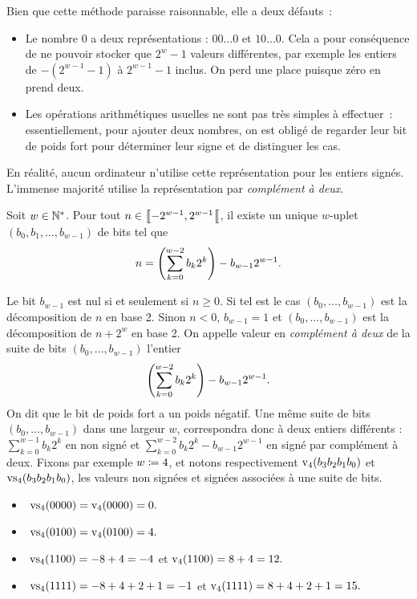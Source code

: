 \documentclass{magnoliaold}
\begin{document}
Bien que cette méthode paraisse raisonnable, elle a deux défauts~:
\begin{itemize}
  \item Le nombre 0 a deux représentations : $00\dots0$ et $10\dots0$. Cela a pour
  conséquence de ne pouvoir stocker que $2^w - 1$ valeurs différentes, par exemple les entiers
  de $-(2^{w-1} - 1)$ à $2^{w- 1} - 1$ inclus. On perd une place puisque zéro en prend deux.
  \item Les opérations arithmétiques usuelles ne sont pas très simples à effectuer~: essentiellement,
  pour ajouter deux nombres, on est obligé de regarder leur bit de poids fort pour déterminer
  leur signe et de distinguer les cas.
\end{itemize}

En réalité, aucun ordinateur n'utilise cette représentation pour les entiers signés.
L'immense majorité utilise la représentation par \emph{complément à deux}.

\begin{proposition}
Soit $w\in{\mathbb{N}^*}$. Pour tout $n\in\left\llbracket -2^{w-1},2^{w-1}\right\llbracket$, il existe un unique $w$-uplet
$(b_0,b_1,\ldots,b_{w-1})$ de bits tel que
\[n=\left(\sum_{k=0}^{w-2} b_k 2^k\right) - b_{w-1}2^{w-1}.\]
\end{proposition}

\begin{remarques}
\remarque Le bit $b_{w-1}$ est nul si et seulement si $n\geq 0$. Si tel est le cas
  $(b_0,\ldots,b_{w-1})$ est la décomposition de $n$ en base 2.
  Sinon $n<0$, $b_{w-1}=1$ et $(b_0,\ldots,b_{w-1})$ est la décomposition de
  $n + 2^w$ en base 2.
\remarque On appelle valeur en \emph{complément à deux} de la suite
de bits $(b_0, \ldots, b_{w-1})$ l'entier
\[\left(\sum_{k=0}^{w-2} b_k 2^k\right) - b_{w-1}2^{w-1}.\]
  On dit que le bit de poids fort a un poids négatif.
\remarque Une même suite de bits $(b_0, \ldots, b_{w-1})$ dans une 
  largeur $w$, correspondra donc à deux entiers différents :
  $\sum_{k = 0}^{w - 1}b_{k} 2^{k}$ en non signé et
  $\sum_{k = 0}^{w - 2}b_{k}2^{k} -b_{w - 1}2^{w - 1}$ en signé par
  complément à deux.
  Fixons par exemple
  $w \coloneqq 4$, et notons respectivement ${\rm v}_{4}(b_{3}b_{2}b_1 b_0)$ et ${\rm vs}_{4}(b_3 b_2 b_1 b_0)$, les
  valeurs non signées et signées associées à une suite de bits.
  \begin{itemize}
    \item $\ {\rm vs}_{4}(0000) = {\rm v}_{4}(0000) = 0.$
    \item $\ {\rm vs}_{4}(0100) = {\rm v}_{4}(0100) = 4.$
    \item $\ {\rm vs}_{4}(1100) = -8 + 4 = -4$ et ${\rm v}_{4}(1100) = 8 + 4 = 12.$
    \item $\ {\rm vs}_{4}(1111) = -8 + 4 + 2 + 1 = -1$ et ${\rm v}_{4}(1111) = 8 + 4 + 2 + 1 = 15.$
  \end{itemize}
\end{remarques}
\end{document}
